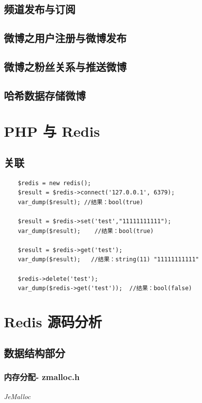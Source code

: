 \documentclass[UTF8,a4paper,12pt]{ctexbook}
\begin{document}
	\section{频道发布与订阅}
	
	\section{微博之用户注册与微博发布}
	
	\section{微博之粉丝关系与推送微博}
	
	\section{哈希数据存储微博}



\chapter{PHP 与 Redis}
	\section{关联}
		\begin{lstlisting}
	$redis = new redis();  
	$result = $redis->connect('127.0.0.1', 6379);  
	var_dump($result); //结果：bool(true)  
	
	$result = $redis->set('test',"11111111111");  
	var_dump($result);    //结果：bool(true)  
	
	$result = $redis->get('test');  
	var_dump($result);   //结果：string(11) "11111111111"  
	
	$redis->delete('test');  
	var_dump($redis->get('test'));  //结果：bool(false)  
		\end{lstlisting}	
		
		
		

\chapter{Redis 源码分析}
	\section{数据结构部分}
		\subsection{内存分配- zmalloc.h}
			\subparagraph{JeMalloc}
			
\end{document}
